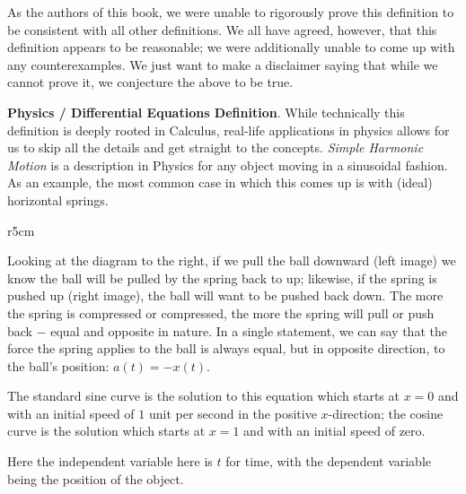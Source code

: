 \documentclass[lang=en,11pt]{elegantbook}
\begin{document}
\begin{remark}
As the authors of this book, we were unable to rigorously prove this definition to be consistent with all other definitions. We all have agreed, however, that this definition appears to be reasonable; we were additionally unable to come up with any counterexamples. We just want to make a disclaimer saying that while we cannot prove it, we conjecture the above to be true.
\end{remark}

\textbf{Physics / Differential Equations Definition}. While technically this definition is deeply rooted in Calculus, real-life applications in physics allows for us to skip all the details and get straight to the concepts. \textit{Simple Harmonic Motion} is a description in Physics for any object moving in a sinusoidal fashion. As an example, the most common case in which this comes up is with (ideal) horizontal springs.

\begin{wrapfigure}{r}{5cm}
\end{wrapfigure}

Looking at the diagram to the right, if we pull the ball downward (left image) we know the ball will be pulled by the spring back to up; likewise, if the spring is pushed up (right image), the ball will want to be pushed back down. The more the spring is compressed or compressed, the more the spring will pull or push back $-$ equal and opposite in nature. In a single statement, we can say that the force the spring applies to the ball is always equal, but in opposite direction, to the ball’s position: $a(t)=-x(t)$.

The standard sine curve is the solution to this equation which starts at $x=0$ and with an initial speed of $1$ unit per second in the positive $x$-direction; the cosine curve is the solution which starts at $x=1$ and with an initial speed of zero.

\begin{remark}
Here the independent variable here is $t$ for time, with the dependent variable being the position of the object.
\end{remark}
\end{document}
